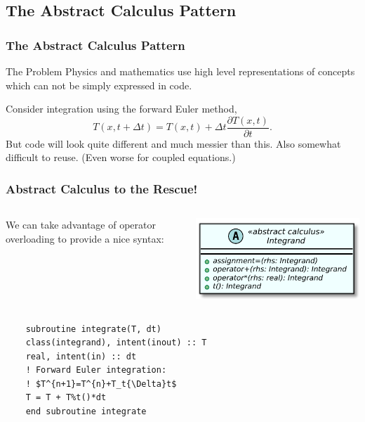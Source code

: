 \documentclass[12pt]{beamer}
\begin{document}
\subsection{The Abstract Calculus Pattern}

\begin{frame}
  \frametitle{The Abstract Calculus Pattern}
  \begin{block}{The Problem}
    Physics and mathematics use high level representations of concepts
    which can not be simply expressed in code.
  \end{block}

  \vspace{2mm}
  Consider integration using the forward Euler
  method,
  $$ T(x,t+\Delta t) = T(x,t) + \Delta t\frac{\partial T(x,t)}{\partial
    t}. $$
  But code will look quite different and much messier than this. Also
  somewhat difficult to reuse. (Even worse for coupled equations.)
\end{frame}

\begin{frame}[fragile=singleslide]
  \frametitle{Abstract Calculus to the Rescue!}
  \begin{columns}
    \begin{column}{0.5\textwidth}
      We can take advantage of operator overloading to provide a nice
      syntax:
    \end{column}
    \begin{column}{0.5\textwidth}
      \includegraphics[width=\textwidth]{abstract_calculus.pdf}
    \end{column}
  \end{columns}
  
  \vspace{3mm}
  \begin{verbatim}
    subroutine integrate(T, dt)
    class(integrand), intent(inout) :: T
    real, intent(in) :: dt
    ! Forward Euler integration:
    ! $T^{n+1}=T^{n}+T_t{\Delta}t$
    T = T + T%t()*dt
    end subroutine integrate
  \end{verbatim}
\end{frame}
\end{document}
